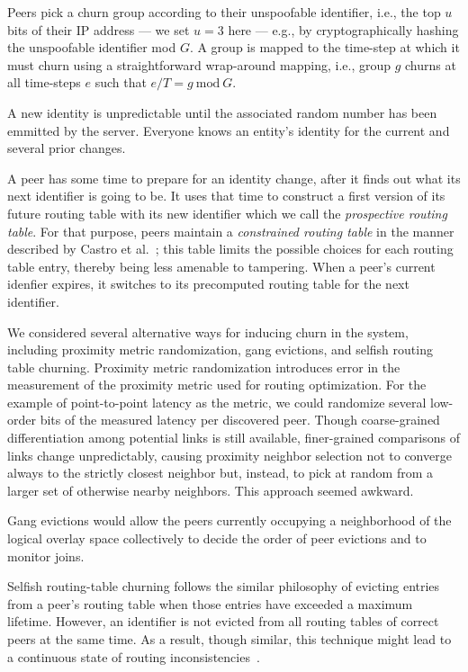 \documentclass[11pt,twocolumn]{MyTightStyle}
\begin{document}
Peers pick a churn group according
to their unspoofable identifier, i.e., the top $u$ bits of their IP
address --- we set $u=3$ here --- e.g., by cryptographically hashing the
unspoofable identifier
mod $G$.  A group is mapped to the time-step at which it must churn
using a straightforward wrap-around mapping, i.e., group $g$ churns at all
time-steps $e$ such that $e/T = g\ \mathrm{mod}\ G$.

A new identity is unpredictable until the associated random number has
been emmitted by the server.  Everyone knows
an entity's identity for the current and several prior changes.

A peer has some time to prepare for an identity change, after it finds
out what its next identifier is going to be.  It uses that time to
construct a first version of its future routing table with its new
identifier which we call the \emph{prospective routing table}.  For that purpose, peers maintain a \emph{constrained
routing table} in the manner described by Castro et
al.~\cite{Castro2002short}; this table limits the possible choices for
each routing table entry, thereby being less amenable to tampering. When
a peer's current idenfier expires, it switches to its precomputed
routing table for the next identifier.


We considered several alternative ways for inducing churn in the system, including
proximity metric randomization, gang evictions, and selfish routing
table churning.  Proximity metric randomization introduces error in the
measurement of the proximity metric used for routing optimization.  For the
example of point-to-point latency as the metric, we could randomize
several low-order bits of the measured latency per discovered peer.
Though coarse-grained differentiation among potential links
is still available, finer-grained comparisons of links change
unpredictably, causing proximity neighbor selection not to
converge always to the strictly closest neighbor  but, instead, to pick
at random from a larger set of otherwise nearby neighbors.  This
approach seemed awkward.

Gang evictions would allow the peers currently occupying a neighborhood
of the logical overlay space collectively to decide the order of peer
evictions and to monitor joins.

Selfish routing-table churning follows the similar philosophy of evicting entries
from a peer's routing table when those entries have exceeded a maximum
lifetime.  However, an identifier is not evicted from all routing tables
of correct peers at the same time.  As a result, though similar, this
technique might lead to a continuous state of routing
inconsistencies~\cite{Liben2002short}.
\end{document}
